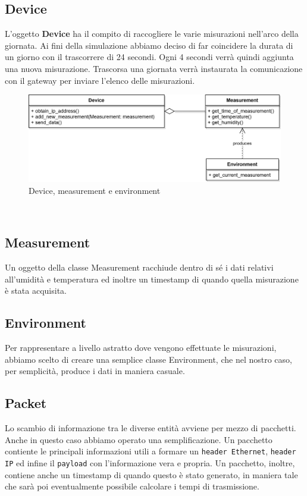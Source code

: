 \documentclass[a4paper,12pt]{report}
\begin{document}
\subsection*{Device}
L'oggetto \textbf{Device} ha il compito di raccogliere le varie misurazioni nell'arco della giornata. Ai fini della simulazione abbiamo deciso di far coincidere la durata di un giorno con il trascorrere di 24 secondi. Ogni 4 secondi verrà quindi aggiunta una nuova misurazione. Trascorsa una giornata verrà instaurata la comunicazione con il gateway per inviare l'elenco delle misurazioni.
\begin{figure}[H]
    \begin{center}
        \centering
        \includegraphics[scale=1]{UML/Device.png}
    \end{center}
    \caption{Device, measurement e environment}
    \label{img:Device}
\end{figure}
\
\\
%
\subsection*{Measurement}
Un oggetto della classe Measurement racchiude dentro di sé i dati relativi all'umidità e temperatura ed inoltre un timestamp di quando quella misurazione è stata acquisita.

\subsection*{Environment}
Per rappresentare a livello astratto dove vengono effettuate le misurazioni, abbiamo scelto di creare una semplice classe Environment, che nel nostro caso, per semplicità, produce i dati in maniera casuale.

\subsection*{Packet}
Lo scambio di informazione tra le diverse entità avviene per mezzo di pacchetti. Anche in questo caso abbiamo operato una semplificazione. Un pacchetto contiente le principali informazioni utili a formare un \texttt{header Ethernet}, \texttt{header IP} ed infine il \texttt{payload} con l'informazione vera e propria. Un pacchetto, inoltre, contiene anche un timestamp di quando questo è stato generato, in maniera tale che sarà poi eventualmente possibile calcolare i tempi di trasmissione.
\end{document}
